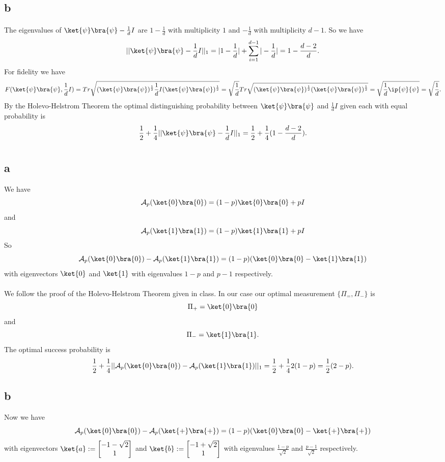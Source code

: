 \documentclass[letterpaper,12pt,oneside,onecolumn]{article}
\newcommand{\cA}{\mathcal{A}} \newcommand{\cB}{\mathcal{B}}
\begin{document}
\subsection{b}
\paragraph{}
The eigenvalues of $\ket{\psi}\bra{\psi} - \frac{1}{d}I$ are $1-\frac{1}{d}$ with multiplicity $1$ and $-\frac{1}{d}$ with multiplicity $d-1$.
So we have $$||\ket{\psi}\bra{\psi} - \frac{1}{d}I ||_1 = |1-\frac{1}{d}| + \sum_{i=1}^{d-1} |-\frac{1}{d}| =1 - \frac{d-2}{d}.$$
For fidelity we have
$$F(\ket{\psi}\bra{\psi}, \frac{1}{d}I) = Tr\sqrt{(\ket{\psi}\bra{\psi})^\frac{1}{2}\frac{1}{d}I (\ket{\psi}\bra{\psi})^\frac{1}{2} } = \sqrt{\frac{1}{d}}Tr\sqrt{(\ket{\psi}\bra{\psi})^\frac{1}{2}(\ket{\psi}\bra{\psi})^\frac{1}{2}} = \sqrt{\frac{1}{d}\ip{\psi}{\psi}} = \sqrt{\frac{1}{d}}.$$
By the Holevo-Helstrom Theorem the optimal distinguishing probability between $\ket{\psi}\bra{\psi}$ and $\frac{1}{d}I$ given each with equal probability is
$$\frac{1}{2} + \frac{1}{4}||\ket{\psi}\bra{\psi} - \frac{1}{d}I ||_1 = \frac{1}{2} + \frac{1}{4}(1 - \frac{d-2}{d}).$$
\newpage
\section{}
\subsection{a}
We have
$$\cA_p(\ket{0}\bra{0}) = (1-p)\ket{0}\bra{0} + pI$$
and
$$\cA_p(\ket{1}\bra{1}) = (1-p)\ket{1}\bra{1} + pI$$
So
$$\cA_p(\ket{0}\bra{0}) - \cA_p(\ket{1}\bra{1})  = (1-p)(\ket{0}\bra{0} - \ket{1}\bra{1})$$
with eigenvectors $\ket{0}$ and $\ket{1}$ with eigenvalues $1-p$ and $p-1$ respectively.
\paragraph{}
We follow the proof of the Holevo-Helstrom Theorem given in class. In our case our optimal measurement $\{\Pi_=, \Pi_-\}$ is
$$\Pi_+ = \ket{0}\bra{0}$$
and
$$\Pi_- = \ket{1}\bra{1}.$$
The optimal success probability is
$$\frac{1}{2} + \frac{1}{4}||\cA_p(\ket{0}\bra{0}) - \cA_p(\ket{1}\bra{1})||_1 = \frac{1}{2} + \frac{1}{4}2(1-p) = \frac{1}{2} (2-p).$$
\subsection{b}
Now we have
$$\cA_p(\ket{0}\bra{0}) - \cA_p(\ket{+}\bra{+}) = (1-p)(\ket{0}\bra{0} - \ket{+}\bra{+})$$
with eigenvectors $\ket{a} := \begin{bmatrix} -1-\sqrt{2} \\ 1\end{bmatrix}$ and $\ket{b} :=\begin{bmatrix} -1 + \sqrt{2} \\ 1 \end{bmatrix}$ with eigenvalues $\frac{1-p}{\sqrt{2}}$ and $\frac{p-1}{\sqrt{2}}$ respectively.
\end{document}
